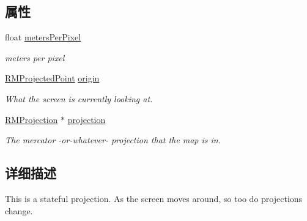 \subsection*{属性}
\begin{DoxyCompactItemize}
\item 
float \hyperlink{interface_r_m_mercator_to_screen_projection_a6e73179ce2febd38c2f8baefedfefc47}{meters\-Per\-Pixel}
\begin{DoxyCompactList}\small\item\em meters per pixel \end{DoxyCompactList}\item 
\hyperlink{struct_r_m_projected_point}{R\-M\-Projected\-Point} \hyperlink{interface_r_m_mercator_to_screen_projection_abc3cfe961a255f28bb2ea051ae2cbaf5}{origin}
\begin{DoxyCompactList}\small\item\em What the screen is currently looking at. \end{DoxyCompactList}\item 
\hyperlink{interface_r_m_projection}{R\-M\-Projection} $\ast$ \hyperlink{interface_r_m_mercator_to_screen_projection_a410f2049effa29cfceb4fa87f77b3f22}{projection}
\begin{DoxyCompactList}\small\item\em The mercator -\/or-\/whatever-\/ projection that the map is in. \end{DoxyCompactList}\end{DoxyCompactItemize}


\subsection{详细描述}
This is a stateful projection. As the screen moves around, so too do projections change. 

